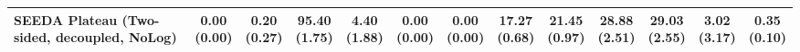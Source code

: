 \begin{table}[H]
{\begin{tabular}{l|cccccc|cccccc}
SEEDA Plateau (Two-sided, decoupled, NoLog) & \makecell{0.00 \\ (0.00)} & \makecell{0.20 \\ (0.27)} & {\cellcolor[HTML]{C8E6C9}} \bfseries \makecell{95.40 \\ (1.75)} & \makecell{4.40 \\ (1.88)} & \makecell{0.00 \\ (0.00)} & \makecell{0.00 \\ (0.00)} & \makecell{17.27 \\ (0.68)} & \makecell{21.45 \\ (0.97)} & {\cellcolor[HTML]{C8E6C9}} \makecell{28.88 \\ (2.51)} & \bfseries \makecell{29.03 \\ (2.55)} & \makecell{3.02 \\ (3.17)} & \makecell{0.35 \\ (0.10)} \\
\bottomrule
\end{tabular}
}%
\end{table}
